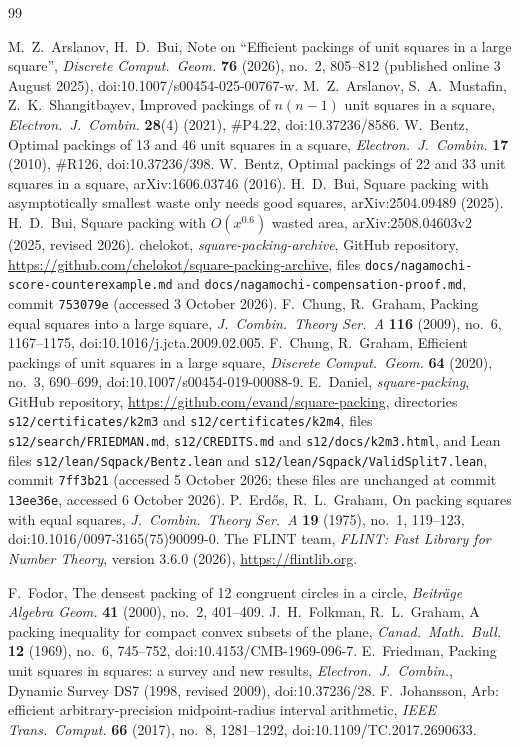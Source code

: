 \documentclass[11pt]{amsart}
\theoremstyle{definition}
\theoremstyle{remark}
\begin{document}
\begin{thebibliography}{99}
\raggedright
{} M.~Z.~Arslanov, H.~D.~Bui, Note on ``Efficient packings of unit squares in a large square'',
\emph{Discrete Comput.\ Geom.} \textbf{76} (2026), no.~2, 805--812 (published online 3 August 2025), doi:10.1007/s00454-025-00767-w.
 M.~Z.~Arslanov, S.~A.~Mustafin, Z.~K.~Shangitbayev, Improved packings of $n(n-1)$ unit squares in a square,
\emph{Electron.\ J.\ Combin.} \textbf{28}(4) (2021), \#P4.22, doi:10.37236/8586.
 W.~Bentz, Optimal packings of 13 and 46 unit squares in a square, \emph{Electron.\ J.\ Combin.} \textbf{17}
(2010), \#R126, doi:10.37236/398.
 W.~Bentz, Optimal packings of 22 and 33 unit squares in a square, arXiv:1606.03746 (2016).
 H.~D.~Bui, Square packing with asymptotically smallest waste only needs good squares,
arXiv:2504.09489 (2025).
 H.~D.~Bui, Square packing with $O(x^{0.6})$ wasted area, arXiv:2508.04603v2 (2025, revised 2026).
 chelokot, \emph{square-packing-archive}, GitHub repository,
\url{https://github.com/chelokot/square-packing-archive}, files \texttt{docs/nagamochi-score-counterexample.md} and
\texttt{docs/nagamochi-compensation-proof.md}, commit \texttt{753079e} (accessed 3 October 2026).
 F.~Chung, R.~Graham, Packing equal squares into a large square, \emph{J.\ Combin.\ Theory Ser.\ A}
\textbf{116} (2009), no.~6, 1167--1175, doi:10.1016/j.jcta.2009.02.005.
 F.~Chung, R.~Graham, Efficient packings of unit squares in a large square, \emph{Discrete Comput.\ Geom.}
\textbf{64} (2020), no.~3, 690--699, doi:10.1007/s00454-019-00088-9.
 E.~Daniel, \emph{square-packing}, GitHub repository, \url{https://github.com/evand/square-packing},
directories \texttt{s12/certificates/k2m3} and \texttt{s12/certificates/k2m4}, files \texttt{s12/search/FRIEDMAN.md},
\texttt{s12/CREDITS.md} and \texttt{s12/docs/k2m3.html}, and Lean files \texttt{s12/lean/Sqpack/Bentz.lean} and
\texttt{s12/lean/Sqpack/ValidSplit7.lean}, commit \texttt{7ff3b21} (accessed 5 October 2026; these files are unchanged at commit
\texttt{13ee36e}, accessed 6 October 2026).
 P.~Erd\H{o}s, R.~L.~Graham, On packing squares with equal squares, \emph{J.\ Combin.\ Theory Ser.\ A}
\textbf{19} (1975), no.~1, 119--123, doi:10.1016/0097-3165(75)90099-0.
 The FLINT team, \emph{FLINT: Fast Library for Number Theory}, version 3.6.0 (2026), \url{https://flintlib.org}.

 F.~Fodor, The densest packing of 12 congruent circles in a circle, \emph{Beitr\"age Algebra Geom.}
\textbf{41} (2000), no.~2, 401--409.
 J.~H.~Folkman, R.~L.~Graham, A packing inequality for compact convex subsets of the plane,
\emph{Canad.\ Math.\ Bull.} \textbf{12} (1969), no.~6, 745--752, doi:10.4153/CMB-1969-096-7.
 E.~Friedman, Packing unit squares in squares: a survey and new results, \emph{Electron.\ J.\ Combin.},
Dynamic Survey DS7 (1998, revised 2009), doi:10.37236/28.
 F.~Johansson, Arb: efficient arbitrary-precision midpoint-radius interval arithmetic, \emph{IEEE Trans.\ Comput.}
\textbf{66} (2017), no.~8, 1281--1292, doi:10.1109/TC.2017.2690633.


\end{thebibliography}
\end{document}
